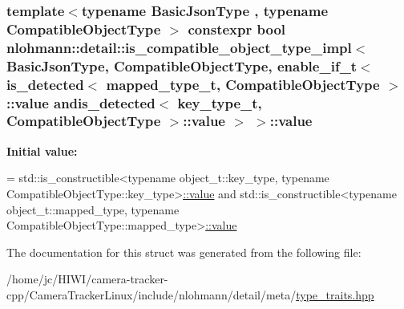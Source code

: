 \subsubsection[{\texorpdfstring{value}{value}}]{\setlength{\rightskip}{0pt plus 5cm}template$<$typename Basic\+Json\+Type , typename Compatible\+Object\+Type $>$ constexpr bool {\bf nlohmann\+::detail\+::is\+\_\+compatible\+\_\+object\+\_\+type\+\_\+impl}$<$ Basic\+Json\+Type, Compatible\+Object\+Type, {\bf enable\+\_\+if\+\_\+t}$<$ {\bf is\+\_\+detected}$<$ {\bf mapped\+\_\+type\+\_\+t}, Compatible\+Object\+Type $>$\+::value andis\+\_\+detected$<$ {\bf key\+\_\+type\+\_\+t}, Compatible\+Object\+Type $>$\+::value $>$ $>$\+::value\hspace{0.3cm}{\ttfamily [static]}}\hypertarget{structnlohmann_1_1detail_1_1is__compatible__object__type__impl_3_01_basic_json_type_00_01_compat75620afbe5f5959fc5f30d50406483f9_ab571ade864dd2e5f931dba4419770bfc}{}\label{structnlohmann_1_1detail_1_1is__compatible__object__type__impl_3_01_basic_json_type_00_01_compat75620afbe5f5959fc5f30d50406483f9_ab571ade864dd2e5f931dba4419770bfc}
{\bfseries Initial value\+:}
\begin{DoxyCode}
=
        std::is\_constructible<\textcolor{keyword}{typename} object\_t::key\_type,
        \textcolor{keyword}{typename} CompatibleObjectType::key\_type>\hyperlink{structnlohmann_1_1detail_1_1is__compatible__object__type__impl_3_01_basic_json_type_00_01_compat75620afbe5f5959fc5f30d50406483f9_ab571ade864dd2e5f931dba4419770bfc}{::value} and
        std::is\_constructible<\textcolor{keyword}{typename} object\_t::mapped\_type,
        \textcolor{keyword}{typename} CompatibleObjectType::mapped\_type>\hyperlink{structnlohmann_1_1detail_1_1is__compatible__object__type__impl_3_01_basic_json_type_00_01_compat75620afbe5f5959fc5f30d50406483f9_ab571ade864dd2e5f931dba4419770bfc}{::value}
\end{DoxyCode}


The documentation for this struct was generated from the following file\+:\begin{DoxyCompactItemize}
\item 
/home/jc/\+H\+I\+W\+I/camera-\/tracker-\/cpp/\+Camera\+Tracker\+Linux/include/nlohmann/detail/meta/\hyperlink{type__traits_8hpp}{type\+\_\+traits.\+hpp}\end{DoxyCompactItemize}
